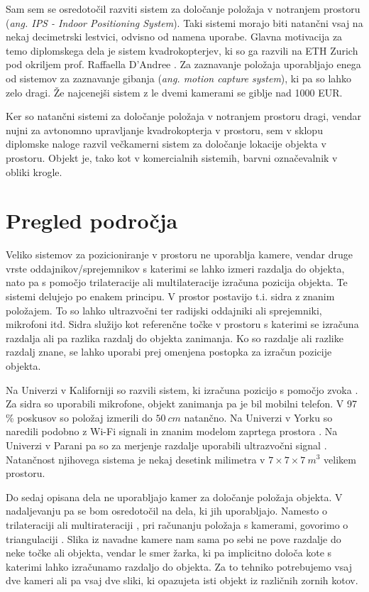\documentclass[a4paper, 12pt]{book}
\begin{document}
Sam sem se osredotočil razviti sistem za določanje položaja v notranjem prostoru (\emph{ang. IPS - Indoor Positioning System}). Taki sistemi morajo biti natančni vsaj na nekaj decimetrski lestvici, odvisno od namena uporabe. Glavna motivacija za temo diplomskega dela je sistem kvadrokopterjev, ki so ga razvili na ETH Zurich pod okriljem prof. Raffaella D’Andree \cite{fma}. Za zaznavanje položaja uporabljajo enega od sistemov za zaznavanje gibanja (\emph{ang. motion capture system}), ki pa so lahko zelo dragi. Že najcenejši sistem z le dvemi kamerami se giblje nad 1000 EUR. 

Ker so natančni sistemi za določanje položaja v notranjem prostoru dragi, vendar nujni za avtonomno upravljanje kvadrokopterja v prostoru, sem v sklopu diplomske naloge razvil večkamerni sistem za določanje lokacije objekta v prostoru. Objekt je, tako kot v komercialnih sistemih, barvni označevalnik v obliki krogle. 

\section{Pregled področja}
Veliko sistemov za pozicioniranje v prostoru ne uporablja kamere, vendar druge vrste oddajnikov/sprejemnikov s katerimi se lahko izmeri razdalja do objekta, nato pa s pomočjo trilateracije \cite{wiki:trilateration} ali multilateracije \cite{wiki:multilateration} izračuna pozicija objekta. Te sistemi delujejo po enakem principu. V prostor postavijo t.i. sidra z znanim položajem. To so lahko ultrazvočni ter radijski oddajniki ali sprejemniki, mikrofoni itd. Sidra služijo kot referenčne točke v prostoru s katerimi se izračuna razdalja ali pa razlika razdalj do objekta zanimanja. Ko so razdalje ali razlike razdalj znane, se lahko uporabi prej omenjena postopka za izračun pozicije objekta.

Na Univerzi v Kaliforniji so razvili sistem, ki izračuna pozicijo s pomočjo zvoka \cite{mandal2005beep}. Za sidra so uporabili mikrofone, objekt zanimanja pa je bil mobilni telefon. V 97 \% poskusov so položaj izmerili do $50 \ cm$ natančno. Na Univerzi v Yorku so naredili podobno z Wi-Fi signali in znanim modelom zaprtega prostora \cite{chan2013dynamic}. Na Univerzi v Parani pa so za merjenje razdalje uporabili ultrazvočni signal \cite{auer20033d}. Natančnost njihovega sistema je nekaj desetink milimetra v $7\times7\times7 \ m^3$ velikem prostoru.

Do sedaj opisana dela ne uporabljajo kamer za določanje položaja objekta. V nadaljevanju pa se bom osredotočil na dela, ki jih uporabljajo. Namesto o trilateraciji \cite{wiki:trilateration} ali multirateraciji \cite{wiki:multilateration}, pri računanju položaja s kamerami, govorimo o triangulaciji \cite{wiki:triangulation}. Slika iz navadne kamere nam sama po sebi ne pove razdalje do neke točke ali objekta, vendar le smer žarka, ki pa implicitno določa kote s katerimi lahko izračunamo razdaljo do objekta. Za to tehniko potrebujemo vsaj dve kameri ali pa vsaj dve sliki, ki opazujeta isti objekt iz različnih zornih kotov.
\end{document}
